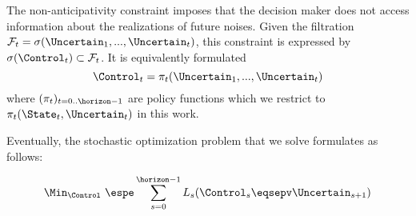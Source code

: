 \documentclass[10pt,a4paper]{article}
\begin{document}
\noindent The non-anticipativity constraint imposes that the decision maker does not access information about the realizations of future noises. Given the filtration $\mathcal{F}_t = \sigma(\Uncertain_1, ..., \Uncertain_t)$, this constraint is expressed by $\sigma(\Control_t) \subset \mathcal{F}_t$. It is equivalently formulated 
\[\Control_t = \pi_t(\Uncertain_1, ..., \Uncertain_t) \]
\noindent where $(\pi_t)_{t=0..\horizon-1}$ are policy functions which we restrict to $\pi_t(\State_t, \Uncertain_t)$ in this work.  

\vspace{0.5cm}

\noindent Eventually, the stochastic optimization problem that we solve formulates as follows:

\begin{equation}
\Min_{\Control} \ \espe \sum_{s=0}^{\horizon-1} L_s(\Control_s \eqsepv \Uncertain_{s+1})
\end{equation}
\end{document}
